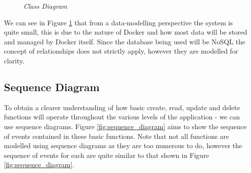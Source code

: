 \begin{figure}[!ht]
\centering
{}
\caption{\em Class Diagram}
\label{fig:class_diagram}
\end{figure}

We can see in Figure \ref{fig:class_diagram} that from a data-modelling perspective the system is quite small, this is due to the nature of Docker and how most data will be stored and managed by Docker itself. Since the database being used will be NoSQL the concept of relationships does not strictly apply, however they are modelled for clarity.

\subsection{Sequence Diagram}

To obtain a clearer understanding of how basic create, read, update and delete functions will operate throughout the various levels of the application - we can use sequence diagrams. Figure \ref{fig:sequence_diagram} aims to show the sequence of events contained in these basic functions. Note that not all functions are modelled using sequence diagrams as they are too numerous to do, however the sequence of events for each are quite similar to that shown in Figure \ref{fig:sequence_diagram}.

